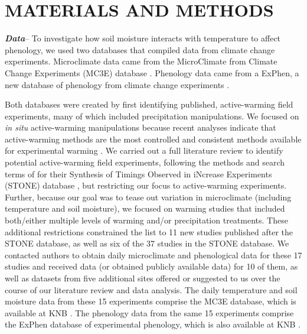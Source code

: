 \documentclass{article}
\begin{document}
\section* {MATERIALS AND METHODS}
\textbf {\emph{Data}}-- To investigate how soil moisture interacts with temperature to affect phenology, we used two databases that compiled data from climate change experiments. Microclimate data came from the  MicroClimate from Climate Change Experiments (MC3E) database \citep{ettinger2018}. Phenology data came from a ExPhen, a new database of phenology from climate change experiments \citep{ettinger2021}. 
\par Both databases were created by first identifying published, active-warming field experiments, many of which included precipitation manipulations. We focused on \textit{in situ} active-warming manipulations because recent analyses indicate that active-warming methods are the most controlled and consistent methods available for experimental warming \citep{kimball2005,kimball2008,aronson2009,wolkovich2012}. We carried out a full literature review to identify potential active-warming field experiments, following the methods and search terms of \citet{wolkovich2012} for their Synthesis of Timings Observed in iNcrease Experiments (STONE) database \citep{wolkovich2012}, but restricting our focus to active-warming experiments. Further, because our goal was to tease out variation in microclimate (including temperature and soil moisture), we focused on warming studies that included both/either multiple levels of warming and/or precipitation treatments. These additional restrictions constrained the list to 11 new studies published after the STONE database, as well as six of the 37 studies in the STONE database. We contacted authors to obtain daily microclimate and phenological data for these 17 studies and received data (or obtained publicly available data) for 10 of them, as well as datasets from five additional sites offered or suggested to us over the course of our literature review and data analysis. The daily temperature and soil moisture data from these 15 experiments comprise the MC3E database, which is available at KNB \citep{ettinger2018}. The phenology data from the same 15 experiments comprise the ExPhen database of experimental phenology, which is also available at KNB \citep{ettinger2021}.
\end{document}
